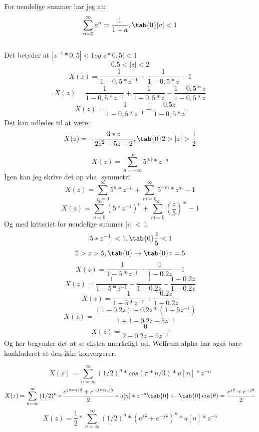 \begin{Opgaver}
\begin{kapitel}[Z transformation]
\begin{Opgave}
\begin{UnderOpgave}[\text{$x[n] = \frac{1}{2}^{|n|}$}]
                For uendelige summer har jeg at: 
                \[\sum_{n=0}^{\infty}{a^n} = \frac{1}{1 - a}, \tab{0} |a| < 1\]
                \\
                Det betyder at $|z^{-1} * 0,5| < 1 og |z * 0,5| < 1$
                \[0.5 < |z| < 2\]
                \[X(z) = \frac{1}{1 - 0,5*z^{-1}} + \frac{1}{1 - 0,5*z} - 1\]
                \[X(z) = \frac{1}{1 - 0,5*z^{-1}} + \frac{1}{1 - 0,5*z} - \frac{1 - 0,5*z}{1 - 0,5*z}\]
                \[X(z) = \frac{1}{1 - 0,5*z^{-1}} + \frac{0.5z}{1 - 0,5*z}\]
                Det kan udledes til at være: 
                \[X(z) = -\frac{3*z}{2z^2 -5z+2},\tab{0} 2 > |z| > \frac{1}{2}\]
            \end{UnderOpgave}
            \begin{UnderOpgave}[\text{$x[n] = 5^{|n|}$}]
                \[X(z) = \sum_{n=-\infty}^{\infty}{5^{|n|} * z^{-n}}\]
                Igen kan jeg skrive det op vha. symmetri. \\
                \[X(z) = \sum_{n=0}^{\infty}{5^{n} * z^{-n}} + \sum_{m=0}^{\infty}{5^{-m} * z^{m}} - 1\]
                \[X(z) = \sum_{n=0}^{\infty}{(5*z^{-1})^{n}} + \sum_{m=0}^{\infty}{(\frac{z}{5})^m} - 1\]
                Og med kriteriet for uendelige summer |a| < 1. \\
                \[|5*z^{-1}| < 1, \tab{0} \frac{z}{5} < 1\]
                \[5 > z > 5, \tab{0}\rightarrow\tab{0} z = 5\]
                \[X(z) = \frac{1}{1 - 5*z^{-1}} + \frac{1}{1 - 0.2z} - 1\]
                \[X(z) = \frac{1}{1 - 5*z^{-1}} + \frac{1}{1 - 0.2z} - \frac{1 - 0.2z}{1 - 0.2z}\]
                \[X(z) = \frac{1}{1 - 5*z^{-1}} + \frac{0.2z}{1 - 0.2z}\]
                \[X(z) = \frac{(1 - 0.2z) + 0.2z*(1 - 5z^{-1})}{1+1 - 0.2z - 5z^{-1}}\]
                \[X(z) = \frac{0}{2 - 0.2z - 5z^{-1}}\]
                Og her begynder det at se ekstra mærkeligt ud, Wolfram alpha har også bare konkluderet at den ikke konvergerer. 
            \end{UnderOpgave}
            \begin{UnderOpgave}[\text{$x[n] = (1/2)^n * cos(\pi * n/3)*u[n]$}, forkert]
                \[X(z) = \sum_{n=\infty}^{\infty}{(1/2)^n * cos(\pi * n/3)*u[n] * z^{-n}}\]
                \[X(z) = \sum_{n=\infty}^{\infty}{(1/2)^n * \frac{e^{j\pi * n/3} + e^{-j\pi * n/3}}{2}*u[n] * z^{-n}} \tab{0}\leftarrow\tab{0} \cos(\theta) = \frac{e^{j\theta} + e^{-j\theta}}{2}\]
                \[X(z) = \frac{1}{2} * \sum_{n=\infty}^{\infty}{(1/2)^n * (e^{j\frac{\pi}{3}} + e^{-j\frac{\pi}{3}})^n*u[n] * z^{-n}}\]

\end{UnderOpgave}
\end{Opgave}
\end{kapitel}
\end{Opgaver}
